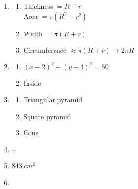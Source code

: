 \documentclass{article}
\begin{document}
\begin{enumerate}
\begin{enumerate}
	\item $\sqrt{119}$
	
	\item $\sqrt{\frac{611}{3}}$
	
	\item $\sqrt{351}$
	
	\end{enumerate}
	
\item

	\begin{enumerate}
	
	\item Thickness $= R - r$ \\
		Area $= \pi(R^2 - r^2)$
	
	\item Width $= \pi(R + r)$
	
	\item Circumference $\approx \pi (R + r) \rightarrow 2\pi R$
	
	\end{enumerate}
	
\item

	\begin{enumerate}
	
	\item $(x - 2)^2 + (y + 4)^2 = 50$
	
	\item Inside
	
	\end{enumerate}
	
\item

	\begin{enumerate}
	
	\item Triangular pyramid
	
	\item Square pyramid
	
	\item Cone
	
	\end{enumerate}
	
\item --

\item $843 \ cm^2$

\item

	\begin{enumerate}
	

\end{enumerate}
\end{enumerate}
\end{document}
